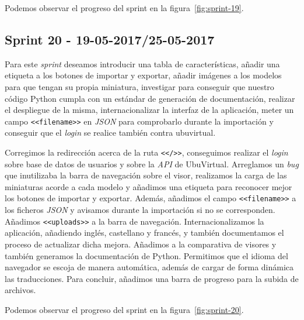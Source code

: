 Podemos observar el progreso del sprint en la figura~\ref{fig:sprint-19}.

\subsection{Sprint 20 - 19-05-2017/25-05-2017}
Para este \textit{sprint} deseamos introducir una tabla de características, añadir una etiqueta a los botones de importar y exportar, añadir imágenes a los modelos para que tengan su propia miniatura, investigar para conseguir que nuestro código Python cumpla con un estándar de generación de documentación, realizar el despliegue de la misma, internacionalizar la interfaz de la aplicación, meter un campo \texttt{<<filename>>} en \textit{JSON} para comprobarlo durante la importación y conseguir que el \textit{login} se realice también contra ubuvirtual.

Corregimos la redirección acerca de la ruta \texttt{<</>>}, conseguimos realizar el \textit{login} sobre base de datos de usuarios y sobre la \textit{API} de UbuVirtual. Arreglamos un \textit{bug} que inutilizaba la barra de navegación sobre el visor, realizamos la carga de las miniaturas acorde a cada modelo y añadimos una etiqueta para reconocer mejor los botones de importar y exportar. Además, añadimos el campo \texttt{<<filename>>} a los ficheros \textit{JSON} y avisamos durante la importación si no se corresponden. Añadimos \texttt{<<uploads>>} a la barra de navegación. Internacionalizamos la aplicación, añadiendo inglés, castellano y francés, y también documentamos el proceso de actualizar dicha mejora. Añadimos a la comparativa de visores y también generamos la documentación de Python. Permitimos que el idioma del navegador se escoja de manera automática, además de cargar de forma dinámica las traducciones. Para concluir, añadimos una barra de progreso para la subida de archivos.

Podemos observar el progreso del sprint en la figura~\ref{fig:sprint-20}.

